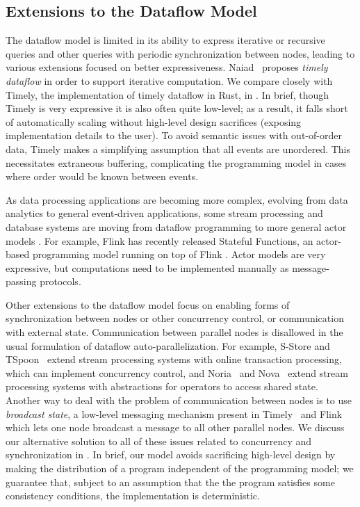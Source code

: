 \subsection{Extensions to the Dataflow Model}

The dataflow model is limited in its ability to express iterative or recursive queries and other queries with periodic synchronization between nodes, leading to various extensions focused on better expressiveness.
Naiad~\cite{Naiad2013,Timely} proposes \emph{timely dataflow} in order
to support iterative computation.
We compare closely with Timely, the implementation of timely dataflow in Rust, in .
In brief, though Timely is very expressive it is also often quite low-level; as a result, it falls short of automatically scaling without high-level design sacrifices (exposing implementation details to the user).
To avoid semantic issues with out-of-order data,
Timely makes a simplifying assumption that all events are unordered. This necessitates extraneous buffering, complicating the programming model in cases where order would be known between events.

As data processing applications are becoming more complex, evolving from
data analytics to general event-driven applications, some stream
processing and database systems are moving from dataflow programming to more
general actor models
\cite{CarboneFKK20,Bernstein19,BernsteinDKM17,Das2018,xu2021move}.
For example, Flink has recently released Stateful Functions,
an actor-based programming model running on top of Flink
\cite{AkhterFK19,StatefulFunctions}.
Actor models are very expressive, but computations need to be implemented manually as
message-passing protocols.

Other extensions to the dataflow model focus on enabling forms of synchronization between nodes or other concurrency control, or communication with external state.
Communication between parallel nodes is disallowed in the usual formulation of dataflow auto-parallelization.
For example, S-Store and TSpoon~\cite{meehan2015s,affetti2020tspoon} extend stream processing systems with online transaction processing, which can implement concurrency control,
and Noria~\cite{gjengset2018noria} and Nova~\cite{zhao2021timestamped} extend stream processing systems with abstractions for operators to access shared state.
Another way to deal with the problem of communication between nodes
is to use \emph{broadcast state}, a low-level messaging mechanism present in
Timely~\cite{BroadcastStateTimely} and Flink~\cite{BroadcastStateFlink}
which lets one node broadcast a message to all other parallel nodes.
We discuss our alternative solution to all of these issues related to concurrency and synchronization in .
In brief, our model avoids sacrificing high-level design by making the distribution of a program independent of the programming model; we guarantee that, subject to an assumption that the the program satisfies some consistency conditions, the implementation is deterministic.

